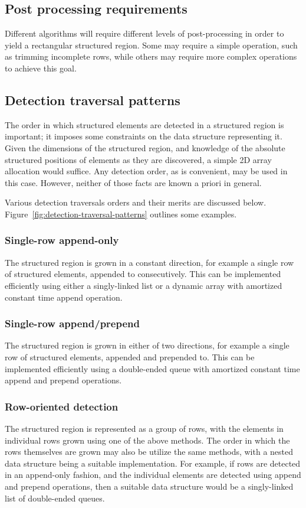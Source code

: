 \subsection{Post processing requirements}
Different algorithms will require different levels of post-processing in order to yield a rectangular structured region. Some may require a simple operation, such as trimming incomplete rows, while others may require more complex operations to achieve this goal.


\subsection{Detection traversal patterns}
The order in which structured elements are detected in a structured region is important; it imposes some constraints on the data structure representing it. Given the dimensions of the structured region, and knowledge of the absolute structured positions of elements as they are discovered, a simple 2D array allocation would suffice. Any detection order, as is convenient, may be used in this case. However, neither of those facts are known a priori in general.

Various detection traversals orders and their merits are discussed below. Figure~\ref{fig:detection-traversal-patterns} outlines some examples.

\subsubsection{Single-row append-only}
\label{append-detection}
The structured region is grown in a constant direction, for example a single row of structured elements, appended to consecutively. This can be implemented efficiently using either a singly-linked list or a dynamic array with amortized constant time append operation.

\subsubsection{Single-row append/prepend}
\label{append-prepend-detection}
The structured region is grown in either of two directions, for example a single row of structured elements, appended and prepended to. This can be implemented efficiently using a double-ended queue with amortized constant time append and prepend operations.

\subsubsection{Row-oriented detection}
The structured region is represented as a group of rows, with the elements in individual rows grown using one of the above methods. The order in which the rows themselves are grown may also be utilize the same methods, with a nested data structure being a suitable implementation. For example, if rows are detected in an append-only fashion, and the individual elements are detected using append and prepend operations, then a suitable data structure would be a singly-linked list of double-ended queues.

